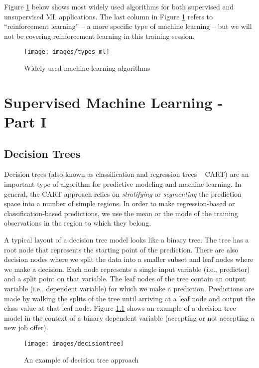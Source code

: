 \documentclass[
]{book}
\begin{document}
Figure \ref{fig:fig5-7} below shows most widely used algorithms for both supervised and unsupervised ML applications. The last column in Figure \ref{fig:fig5-7} refers to ``reinforcement learning'' -- a more specific type of machine learning -- but we will not be covering reinforcement learning in this training session.

\begin{figure}
\texttt{[image: images/types\_ml]} \caption{Widely used machine learning algorithms}\label{fig:fig5-7}
\end{figure}

\hypertarget{supervised-machine-learning---part-i}{%
\chapter{Supervised Machine Learning - Part I}\label{supervised-machine-learning---part-i}}

\hypertarget{decision-trees}{%
\section{Decision Trees}\label{decision-trees}}

Decision trees (also known as classification and regression trees -- CART) are an important type of algorithm for predictive modeling and machine learning. In general, the CART approach relies on \emph{stratifying} or \emph{segmenting} the prediction space into a number of simple regions. In order to make regression-based or classification-based predictions, we use the mean or the mode of the training observations in the region to which they belong.

A typical layout of a decision tree model looks like a binary tree. The tree has a root node that represents the starting point of the prediction. There are also decision nodes where we split the data into a smaller subset and leaf nodes where we make a decision. Each node represents a single input variable (i.e., predictor) and a split point on that variable. The leaf nodes of the tree contain an output variable (i.e., dependent variable) for which we make a prediction. Predictions are made by walking the splits of the tree until arriving at a leaf node and output the class value at that leaf node. Figure \ref{fig:fig6-1} shows an example of a decision tree model in the context of a binary dependent variable (accepting or not accepting a new job offer).

\begin{figure}
\texttt{[image: images/decisiontree]} \caption{An example of decision tree approach}\label{fig:fig6-1}
\end{figure}
\end{document}
